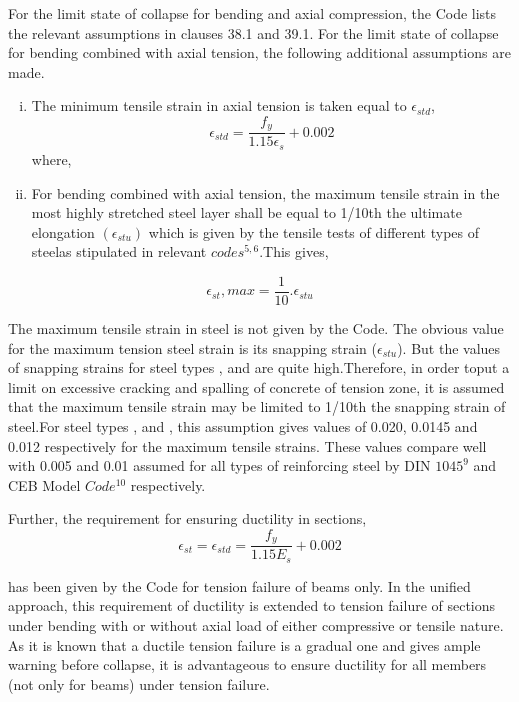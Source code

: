 For the limit state of collapse for bending and axial compression, the
Code lists the relevant assumptions in clauses 38.1 and 39.1. For the
limit state of collapse for bending combined with axial tension, the
following additional assumptions are made.

\begin{enumerate}[(i)]
\item The minimum tensile strain in axial tension is taken equal to
$\epsilon_{std}$,
\begin{equation}
\epsilon_{std}=\frac{f_y}{1.15{\epsilon_s}}+0.002
\end{equation}
where, 
\item  For bending combined with axial tension, the maximum tensile
strain in the most highly stretched steel layer shall be equal to 1/10th
the ultimate elongation $(\epsilon_{stu})$ which is given by the tensile
tests of different types of steelas stipulated in relevant
$codes^{5,6}$.This gives,
\end{enumerate}
\begin{equation}
\epsilon_{st},max=\frac{1}{10}.\epsilon_{stu}
\end{equation}

The maximum tensile strain in steel is not given by the Code. The obvious
value for the maximum tension steel strain is its snapping strain
($\epsilon_{stu}$). But the values of snapping strains for steel types
{\fetwofivezero},{\fefouronefive} and {\fefivezerozero} are quite high.Therefore,
in order toput a limit on excessive cracking and spalling of concrete of tension zone,
it is assumed that the maximum tensile strain may be limited to 1/10th the snapping strain
of steel.For steel types {\fetwofivezero}, {\fefouronefive} and {\fefivezerozero},
this assumption gives values of 0.020, 0.0145 and 0.012 respectively for the maximum tensile strains. 
These values compare well with 0.005 and 0.01 assumed for all types of
reinforcing steel by DIN $1045^9$ and CEB Model $Code^{10}$ respectively.

Further, the requirement for ensuring ductility in sections,
$$\epsilon_{st}=\epsilon_{std}=\frac{f_y}{1.15 E_s}+0.002$$

has been given by the Code for tension failure of beams only. In the
uniﬁed approach, this requirement of ductility is extended to tension
failure of sections under bending with or without axial load of either
compressive or tensile nature. As it is known that a ductile tension
failure is a gradual one and gives ample warning before collapse, it
is advantageous to ensure ductility for all members (not only for beams) 
under tension failure.


